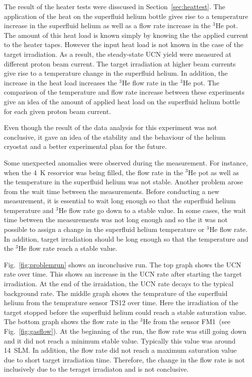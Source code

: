 The result of the heater tests were disscused in
Section~\ref{sec:heattest}. The application of the heat on the
superfluid helium bottle gives rise to a temperature increase in the
superfluid helium as well as a flow rate increase in the $^3$He
pot. The amount of this heat load is known simply by knowing the the
applied current to the heater tapes. However the input heat load is
not known in the case of the target irradiation. As a result, the
steady-state UCN yield were measured at different proton beam
current. The target irradiation at higher beam currents give rise to a
temperature change in the superfluid helium. In addition, the increase
in the heat load increases the $^3$He flow rate in the $^3$He pot.
The comparison of the temperature and flow rate increase between these
experiments give an idea of the amount of applied heat load on the
superfluid helium bottle for each given proton beam current.

Even though the result of the data analysis for this experiment was
not conclusive, it gave an idea of the stability and the behaviour of
the helium cryostat and a better experimental plan for the future.

Some unexpected anomalies were observed during the measurement. For
instance, when the 4~K resorvior was being filled, the flow rate in
the $^3$He pot as well as the temperature in the superfluid helium was
not stable. Another problem arose from the wait time between the
measurements. Before conducting a new measurement, it is essential to
wait long enough so that the superfluid helium temperature and $^3$He
flow rate go down to a stable value. In some cases, the wait time
between the measurements was not long enough and so the it was not
possible to assign a change in the superfluid helium temperature or
$^3$He flow rate. In addition, target irradiation should be long
enough so that the temperature and the $^3$He flow rate reach a stable
value.

Fig.~\ref{fig:problemrun} shows an inconclusive run. The top graph
shows the UCN rate over time. This shows an increase in the UCN rate
after starting the target irradiation. At the end of the irraidation,
the UCN rate decays to the typical background rate. The middle graph
shows the temprature of the superfluid helium from the temprature
sensor TS12 over time. Here the irradiation of the target stopped
before the superfluid helium could reach a stable saturation
value. The bottom graph shows the flow rate in the $^3$He from the
sensor FM1~(see Fig.~\ref{fig:gasflow}). At the beginning of the run,
the flow rate was still going down and it did not reach a minimum
stable value. Typically this value was around 14~SLM. In addition, the
flow rate did not reach a maximum saturation value due to short target
irradiation time. Therefore, the change in the flow rate is not
inclusively due to the teraget irradiaton and is not conclusive.



